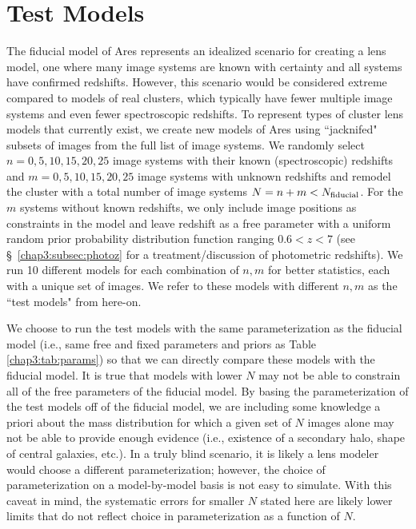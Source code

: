 \section{Test Models}
\label{chap3:sec:methods}

The fiducial model of Ares represents an idealized scenario for creating a lens model, one where many image systems are known with certainty and all systems have confirmed redshifts. However, this scenario would be considered extreme compared to models of real clusters, which typically have fewer multiple image systems and even fewer spectroscopic redshifts. To represent types of cluster lens models that currently exist, we create new models of Ares using ``jacknifed" subsets of images from the full list of image systems. We randomly select $n=0,5,10,15,20,25$ image systems with their known (spectroscopic) redshifts and $m=0,5,10,15,20,25$ image systems with unknown redshifts and remodel the cluster with a total number of image systems $N=n+m<N_\mathrm{fiducial}$. For the $m$ systems without known redshifts, we only include image positions as constraints in the model and leave redshift as a free parameter with a uniform random prior probability distribution function ranging $0.6<z<7$ (see \S~\ref{chap3:subsec:photoz} for a treatment/discussion of photometric redshifts). We run 10 different models for each combination of $n,m$ for better statistics, each with a unique set of images. We refer to these models with different $n,m$ as the ``test models" from here-on.

We choose to run the test models with the same parameterization as the fiducial model (i.e., same free and fixed parameters and priors as Table \ref{chap3:tab:params}) so that we can directly compare these models with the fiducial model. It is true that models with lower $N$ may not be able to constrain all of the free parameters of the fiducial model. By basing the parameterization of the test models off of the fiducial model, we are including some knowledge a priori about the mass distribution for which a given set of $N$ images alone may not be able to provide enough evidence (i.e., existence of a secondary halo, shape of central galaxies, etc.). In a truly blind scenario, it is likely a lens modeler would choose a different parameterization; however, the choice of parameterization on a model-by-model basis is not easy to simulate. With this caveat in mind, the systematic errors for smaller $N$ stated here are likely lower limits that do not reflect choice in parameterization as a function of $N$.

